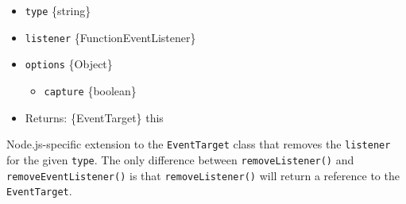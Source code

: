 \begin{itemize}
\item
  \texttt{type} \{string\}
\item
  \texttt{listener} \{Function\textbar EventListener\}
\item
  \texttt{options} \{Object\}

  \begin{itemize}
  \tightlist
  \item
    \texttt{capture} \{boolean\}
  \end{itemize}
\item
  Returns: \{EventTarget\} this
\end{itemize}

Node.js-specific extension to the \texttt{EventTarget} class that
removes the \texttt{listener} for the given \texttt{type}. The only
difference between \texttt{removeListener()} and
\texttt{removeEventListener()} is that \texttt{removeListener()} will
return a reference to the \texttt{EventTarget}.
